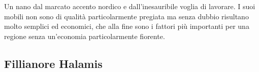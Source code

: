Un nano dal marcato accento nordico e dall'inesauribile voglia di lavorare. I suoi mobili non sono di qualità particolarmente pregiata ma senza dubbio risultano molto semplici ed economici, che alla fine sono i fattori più importanti per una regione senza un'economia particolarmente fiorente.

\subsection{Fillianore Halamis}

\subsubsection{}